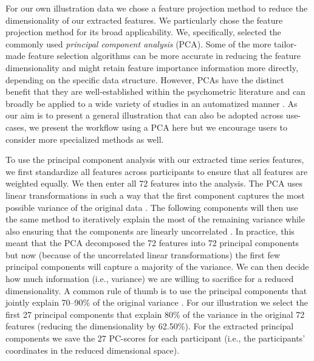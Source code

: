 For our own illustration data we chose a feature projection method to
reduce the dimensionality of our extracted features. We particularly
chose the feature projection method for its broad applicability. We,
specifically, selected the commonly used
\textit{principal component analysis} (PCA). Some of the more
tailor-made feature selection algorithms can be more accurate in
reducing the feature dimensionality and might retain feature importance
information more directly, depending on the specific data structure.
However, PCAs have the distinct benefit that they are well-established
within the psychometric literature \citep{jolliffe2011} and can broadly
be applied to a wide variety of studies in an automatized manner
\citep{abdi2010}. As our aim is to present a general illustration that
can also be adopted across use-cases, we present the workflow using a
PCA here but we encourage users to consider more specialized methods as
well.

To use the principal component analysis with our extracted time series
features, we first standardize all features across participants to
ensure that all features are weighted equally. We then enter all 72
features into the analysis. The PCA uses linear transformations in such
a way that the first component captures the most possible variance of
the original data
\citep[e.g., by finding a vector that maximizes the sum of squared distances][]{jolliffe2002, abdi2010}.
The following components will then use the same method to iteratively
explain the most of the remaining variance while also ensuring that the
components are linearly uncorrelated \citep{shlens2014}. In practice,
this meant that the PCA decomposed the 72 features into 72 principal
components but now (because of the uncorrelated linear transformations)
the first few principal components will capture a majority of the
variance. We can then decide how much information (i.e., variance) we
are willing to sacrifice for a reduced dimensionality. A common rule of
thumb is to use the principal components that jointly explain 70--90\%
of the original variance
\citep[i.e., cumulative percentage explained variance; e.g.,][]{jackson2003}.
For our illustration we select the first 27 principal components that
explain 80\% of the variance in the original 72 features (reducing the
dimensionality by 62.50\%). For the extracted principal components we
save the 27 PC-scores for each participant (i.e., the participants'
coordinates in the reduced dimensional space).

